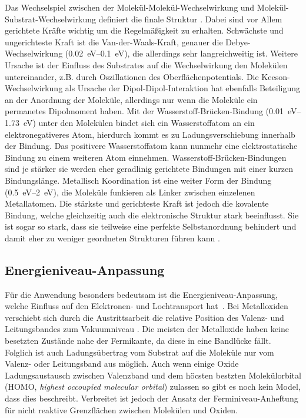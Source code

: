             Das Wechselspiel zwischen der Molekül-Molekül-Wechselwirkung und Molekül-Substrat-Wechselwirkung definiert die finale Struktur \cite{IF_1}.
            Dabei sind vor Allem gerichtete Kräfte wichtig um die Regelmäßigkeit zu erhalten.
            Schwächste und ungerichteste Kraft ist die Van-der-Waals-Kraft, genauer die Debye-Wechselwirkung (\SIrange{0.02}{0.1}{\electronvolt}), die allerdings sehr langreichweitig ist.
            Weitere Ursache ist der Einfluss des Substrates auf die Wechselwirkung den Molekülen untereinander, z.B. durch Oszillationen des Oberflächenpotentials.
            Die Keeson-Wechselwirkung als Ursache der Dipol-Dipol-Interaktion hat ebenfalls Beteiligung an der Anordnung der Moleküle, allerdings nur wenn die Moleküle ein permanetes Dipolmoment haben.
            Mit der Wasserstoff-Brücken-Bindung (\SIrange{0.01}{1.73}{\electronvolt}) unter den Molekülen bindet sich ein Wasserstoffatom an ein elektronegativeres Atom, hierdurch kommt es zu Ladungsverschiebung innerhalb der Bindung.
            Das positivere Wasserstoffatom kann nunmehr eine elektrostatische Bindung zu einem weiteren Atom einnehmen.
            Wasserstoff-Brücken-Bindungen sind je stärker sie werden eher geradlinig gerichtete Bindungen mit einer kurzen Bindungslänge.
            Metallisch Koordination ist eine weiter Form der Bindung (\SIrange{0.5}{2}{\electronvolt}), die Moleküle funkieren als Linker zwischen einzelenen Metallatomen.
            Die stärkste und gerichteste Kraft ist jedoch die kovalente Bindung, welche gleichzeitig auch die elektronische Struktur stark beeinflusst.
            Sie ist sogar so stark, dass sie teilweise eine perfekte Selbstanordnung behindert und damit eher zu weniger geordneten Strukturen führen kann \cite{IF_1}.

        \subsection{Energieniveau-Anpassung}
            Für die Anwendung besonders bedeutsam ist die Energieniveau-Anpassung, welche Einfluss auf den Elektronen- und Lochtransport hat~\cite{IF_4}.
            Bei Metalloxiden verschiebt sich durch die Austrittsarbeit die relative Position des Valenz- und Leitungsbandes zum Vakuumniveau \cite{IF_3}.
            Die meisten der Metalloxide haben keine besetzten Zustände nahe der Fermikante, da diese in eine Bandlücke fällt.
            Folglich ist auch Ladungsübertrag vom Substrat auf die Moleküle nur vom Valenz- oder Leitungsband aus möglich.
            Auch wenn einige Oxide Ladungsaustausch zwischen Valenzband und dem höcsten bestzten Molekülorbital (HOMO, \textit{highest occoupied molecular orbital}) zulassen so  gibt es noch kein Model, dass dies beschreibt.
            Verbreitet ist jedoch der Ansatz der Ferminiveau-Anheftung für nicht reaktive Grenzflächen zwischen Molekülen und Oxiden.

